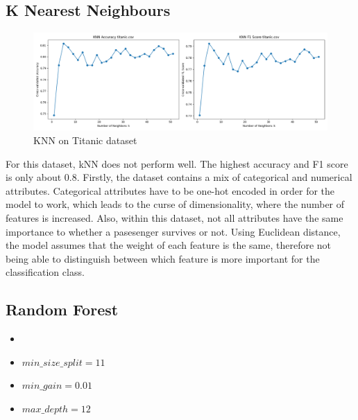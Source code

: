 \documentclass[letterpaper]{article}
\begin{document}
\subsection*{K Nearest Neighbours}
\begin{figure}[H]
	\includegraphics[width=\textwidth]{figures/knn_titanic.csv.png}
	\caption{KNN on Titanic dataset}
	\label{fig:knn-titanic}
\end{figure}
For this dataset, kNN does not perform well. The highest accuracy and F1 score is only about 0.8.
Firstly, the dataset contains a mix of categorical and numerical attributes. Categorical attributes have to be one-hot encoded in order for the model to work, which leads to the curse of dimensionality, where the number of features is increased.
Also, within this dataset, not all attributes have the same importance to whether a pasesenger survives or not. Using Euclidean distance, the model assumes that the weight of each feature is the same, therefore not being able to distinguish between which feature is more important for the classification class.

\subsection*{Random Forest}
\begin{itemize}
	\item {}
	\item $min\_size\_split = 11$
	\item $min\_gain = 0.01$
	\item $max\_depth = 12$
\end{itemize}
\end{document}
